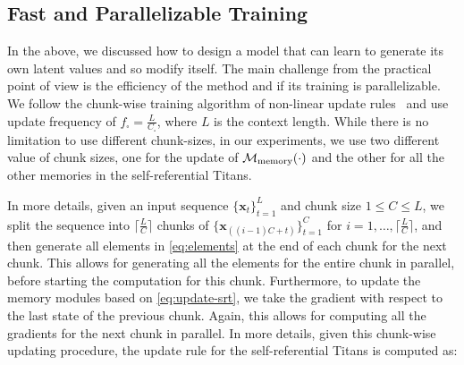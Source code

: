 {\subsection{Fast and Parallelizable Training}\label{sec:Parallel-srt}
In the above, we discussed how to design a model that can learn to generate its own latent values and so modify itself. The main challenge from the practical point of view is the efficiency of the method and if its training is parallelizable. We follow the chunk-wise training algorithm of non-linear update rules~\citep{sun2024learning, behrouz2024titans} and use update frequency of $f_{\square} = \frac{L}{C_{\square}}$, where $L$ is the context length. While there is no limitation to use different chunk-sizes, in our experiments, we use two different value of chunk sizes, one for the update of $\mathcal{M}_{\text{memory}}(\cdot)$ and the other for all the other memories in the self-referential Titans. 

In more details, given an input sequence $\{\boldsymbol{x}_t\}_{t=1}^{L}$ and chunk size $1 \leq C \leq L$, we split the sequence into $\lceil \frac{L}{C} \rceil$ chunks of $\{\boldsymbol{x}_{((i-1)C + t)} \}_{t = 1}^{C}$ for $i = 1, \dots , \lceil \frac{L}{C} \rceil$, and then generate all elements in \autoref{eq:elements} at the end of each chunk for the next chunk. This allows for generating all the elements for the entire chunk in parallel, before starting the computation for this chunk. Furthermore, to update the memory modules based on \autoref{eq:update-srt}, we take the gradient with respect to the last state of the previous chunk. Again, this allows for computing all the gradients for the next chunk in parallel. In more details, given this chunk-wise updating procedure, the update rule for the self-referential Titans is computed as:

}
